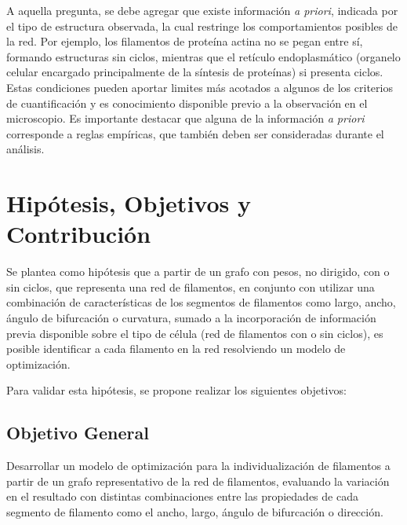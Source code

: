 \documentclass{article}
\begin{document}

A aquella pregunta, se debe agregar que existe informaci\'on \textit{a priori}, indicada por el tipo de estructura observada, la cual restringe los comportamientos posibles de la red. Por ejemplo, los filamentos de prote\'ina actina no se pegan entre s\'i, formando estructuras sin ciclos, mientras que el ret\'iculo endoplasm\'atico (organelo celular encargado principalmente de la s\'intesis de prote\'inas) si presenta ciclos. Estas condiciones pueden aportar limites m\'as acotados a algunos de los criterios de cuantificaci\'on y es conocimiento disponible previo a la observaci\'on en el microscopio. Es importante destacar que alguna de la informaci\'on {\it a priori} corresponde a reglas emp\'iricas, que tambi\'en deben ser consideradas durante el an\'alisis.


\section{Hipótesis, Objetivos y Contribuci\'on}
\label{hipotesis}
Se plantea como hip\'otesis que a partir de un grafo con pesos, no dirigido, con o sin ciclos, que representa una red de filamentos, en conjunto con utilizar una combinaci\'on de caracter\'isticas de los segmentos de filamentos como largo, ancho, \'angulo de bifurcaci\'on o curvatura, sumado a la incorporaci\'on de informaci\'on previa disponible sobre el tipo de c\'elula (red de filamentos con o sin ciclos), es posible identificar a cada filamento en la red resolviendo un modelo de optimizaci\'on.

Para validar esta hip\'otesis, se propone realizar los siguientes objetivos:
\subsection{Objetivo General}
Desarrollar un modelo de optimizaci\'on para la individualizaci\'on de filamentos a partir de un grafo representativo de la red de filamentos, evaluando la variaci\'on en el resultado con distintas combinaciones entre las propiedades de cada segmento de filamento como el ancho, largo, \'angulo de bifurcaci\'on o direcci\'on.
\end{document}
